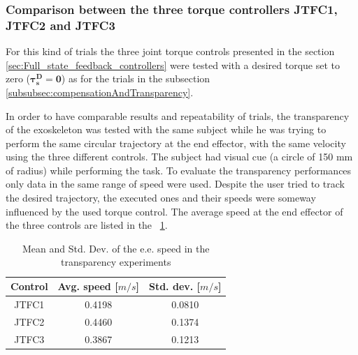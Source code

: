 \documentclass[journal]{IEEEtran}
\newcommand{\vects}[1]{{\boldsymbol {#1}}}
\begin{document}
\subsubsection{Comparison between the three torque controllers JTFC1, JTFC2 and JTFC3}
For this kind of trials the three joint torque controls presented in the section \ref{sec:Full_state_feedback_controllers} were tested with a desired torque set to zero ($\vects{\tau_s^D=0}$) as for the trials in the subsection \ref{subsubsec:compensationAndTransparency}. 
\par In order to have comparable results and repeatability of trials, the transparency of the exoskeleton was tested with the same subject while he was trying to perform the same circular trajectory at the end effector, with the same velocity using the three different controls. The subject had visual cue (a circle of 150 mm of radius) while performing the task.
To evaluate the transparency performances only data in the same range of speed were used.
Despite the user tried to track the desired trajectory, the executed ones and their speeds were someway influenced by the used torque control. The average speed at the end effector of the three controls are listed in the \tablename \ \ref{tab:transparencySpeeds}.
%
\begin{table}[]
	\renewcommand{\arraystretch}{1.3}
	\caption{Mean and Std. Dev. of the e.e. speed in the transparency experiments}
	\label{tab:transparencySpeeds}
	\centering
	\begin{tabular}{c c c}
		\hline \hline
		\bfseries Control & \bfseries Avg. speed [$m/s$] & \bfseries Std. dev. [$m/s$]\\
		\hline
		JTFC1 & 0.4198 & 0.0810\\
		JTFC2 & 0.4460 & 0.1374\\
		JTFC3 & 0.3867 & 0.1213\\
		\hline \hline
	\end{tabular}
\end{table}
\end{document}
